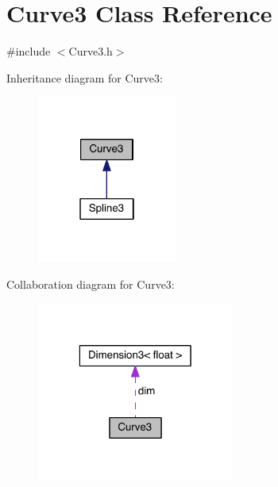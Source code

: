 \hypertarget{class_curve3}{\section{Curve3 Class Reference}
\label{class_curve3}
}


{\ttfamily \#include $<$Curve3.\-h$>$}



Inheritance diagram for Curve3\-:
\nopagebreak
\begin{figure}[H]
\begin{center}
\leavevmode
\includegraphics[width=130pt]{class_curve3__inherit__graph}
\end{center}
\end{figure}


Collaboration diagram for Curve3\-:
\nopagebreak
\begin{figure}[H]
\begin{center}
\leavevmode
\includegraphics[width=184pt]{class_curve3__coll__graph}
\end{center}
\end{figure}
